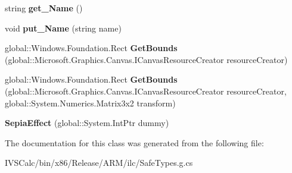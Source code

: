 \begin{DoxyCompactItemize}
\item 
\mbox{\label{class_microsoft_1_1_graphics_1_1_canvas_1_1_effects_1_1_sepia_effect_afee6799351e6092b77d4ec5db2f9362d}} 
string {\bfseries get\+\_\+\+Name} ()
\item 
\mbox{\label{class_microsoft_1_1_graphics_1_1_canvas_1_1_effects_1_1_sepia_effect_aada16984eae7d02db5a9f3c837166f22}} 
void {\bfseries put\+\_\+\+Name} (string name)
\item 
\mbox{\label{class_microsoft_1_1_graphics_1_1_canvas_1_1_effects_1_1_sepia_effect_add8f6369add3dc63f033fece446695bb}} 
global\+::\+Windows.\+Foundation.\+Rect {\bfseries Get\+Bounds} (global\+::\+Microsoft.\+Graphics.\+Canvas.\+I\+Canvas\+Resource\+Creator resource\+Creator)
\item 
\mbox{\label{class_microsoft_1_1_graphics_1_1_canvas_1_1_effects_1_1_sepia_effect_a383c90027b969cb3a3d212a103518d83}} 
global\+::\+Windows.\+Foundation.\+Rect {\bfseries Get\+Bounds} (global\+::\+Microsoft.\+Graphics.\+Canvas.\+I\+Canvas\+Resource\+Creator resource\+Creator, global\+::\+System.\+Numerics.\+Matrix3x2 transform)
\item 
\mbox{\label{class_microsoft_1_1_graphics_1_1_canvas_1_1_effects_1_1_sepia_effect_a4f03d37d7ecbcbf4f61d46c7966819d0}} 
{\bfseries Sepia\+Effect} (global\+::\+System.\+Int\+Ptr dummy)
\end{DoxyCompactItemize}


The documentation for this class was generated from the following file\+:\begin{DoxyCompactItemize}
\item 
I\+V\+S\+Calc/bin/x86/\+Release/\+A\+R\+M/ilc/Safe\+Types.\+g.\+cs\end{DoxyCompactItemize}
